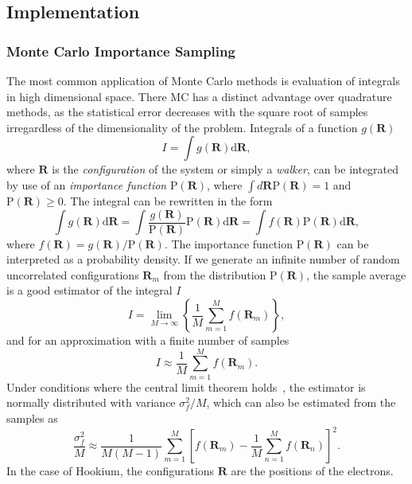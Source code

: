 \subsection{Implementation}
\label{subsec:qmc-impl}
\subsubsection{Monte Carlo Importance Sampling}
The most common application of Monte Carlo methods is evaluation of integrals in high dimensional space. There MC has a distinct advantage over quadrature methods, as the statistical error decreases with the square root of samples irregardless of the dimensionality of the problem. Integrals of a function $g(\mathbf{R})$
\begin{equation}
	I=\int g(\mathbf{R}) \mathrm{d} \mathbf{R},
\end{equation}
where $\mathbf{R}$ is the \emph{configuration} of the system or simply a \emph{walker}, can be integrated by use of an \emph{importance function} $\mathrm{P}(\mathbf{R})$, where $\int d \mathbf{R} \text{P}(\mathbf{R})=1$ and $\mathrm{P} (\mathbf{R}) \geq 0$. The integral can be rewritten in the form
\begin{equation}
	\int g(\mathbf{R}) \mathrm{d} \mathbf{R} = \int \frac{g(\mathbf{R})}{\mathrm{P}(\mathbf{R})} \mathrm{P}(\mathbf{R}) \mathrm{d} \mathbf{R} = \int f(\mathbf{R})\mathrm{P}(\mathbf{R}) \mathrm{d} \mathbf{R},
\end{equation}
where $f(\mathbf{R}) = g(\mathbf{R}) / \mathrm{P}(\mathbf{R})$.
The importance function $\mathrm{P}(\mathbf{R})$ can be interpreted as a probability density. If we generate an infinite number of random uncorrelated configurations $\mathbf{R}_m$ from the distribution $\mathrm{P}(\mathbf{R})$, the sample average is a good estimator of the integral $I$
\begin{equation}
	I=\lim _{M \rightarrow \infty}\left\{\frac{1}{M} \sum_{m=1}^{M} f\left(\mathbf{R}_{m}\right)\right\},
\end{equation}
and for an approximation with a finite number of samples
\begin{equation}
	I \approx \frac{1}{M} \sum_{m=1}^{M} f\left(\mathbf{R}_{m}\right).
\end{equation}
Under conditions where the central limit theorem holds~\cite{foulkes2001quantum}, the estimator is normally distributed with variance $\sigma_{f}^{2}/M$, which can also be estimated from the samples as
\begin{equation}
	\frac{\sigma_{f}^{2}}{M} \approx \frac{1}{M(M-1)} \sum_{m=1}^{M}\left[f\left(\mathbf{R}_{m}\right)-\frac{1}{M} \sum_{n=1}^{M} f\left(\mathbf{R}_{n}\right)\right]^{2}.
\end{equation}
In the case of Hookium, the configurations $\mathbf{R}$ are the positions of the electrons.

